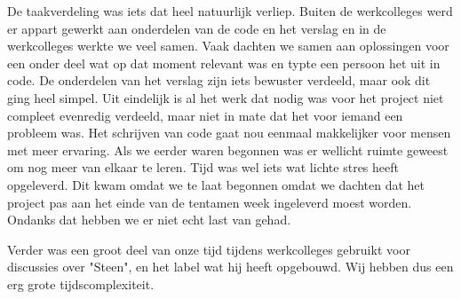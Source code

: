 \documentclass{article}
\begin{document}
De taakverdeling was iets dat heel natuurlijk verliep. Buiten de werkcolleges werd er appart gewerkt aan onderdelen van de code en het verslag en in de werkcolleges werkte we veel samen. Vaak dachten we samen aan oplossingen voor een onder deel wat op dat moment relevant was en typte een persoon het uit in code. De onderdelen van het verslag zijn iets bewuster verdeeld, maar ook dit ging heel simpel. Uit eindelijk is al het werk dat nodig was voor het project niet compleet evenredig verdeeld, maar niet in mate dat het voor iemand een probleem was. Het schrijven van code gaat nou eenmaal makkelijker voor mensen met meer ervaring. Als we eerder waren begonnen was er wellicht ruimte geweest om nog meer van elkaar te leren. \newline
Tijd was wel iets wat lichte stres heeft opgeleverd. Dit kwam omdat we te laat begonnen omdat we dachten dat het project pas aan het einde van de tentamen week ingeleverd moest worden. Ondanks dat hebben we er niet echt last van gehad.


Verder was een groot deel van onze tijd tijdens werkcolleges gebruikt voor discussies over "Steen", en het label wat hij heeft opgebouwd. Wij hebben dus een erg grote tijdscomplexiteit. 
\end{document}
